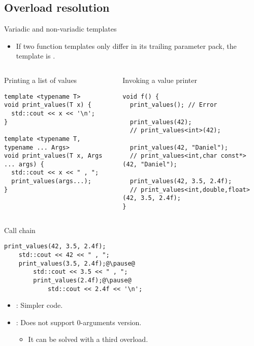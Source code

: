 \subsection{Overload resolution}

\begin{frame}[t,fragile]{Variadic and non-variadic templates}
  \begin{itemize}
    \item If two function templates only differ in its trailing
          parameter pack, the  template is .
  \end{itemize}

\begin{columns}[T]

\begin{block}{Printing a list of values}
\begin{lstlisting}
template <typename T>
void print_values(T x) {
  std::cout << x << '\n';
}

template <typename T, typename ... Args>
void print_values(T x, Args ... args) {
  std::cout << x << " , ";
  print_values(args...);
}
\end{lstlisting}
\end{block}

\begin{block}{Invoking a value printer}
\begin{lstlisting}
void f() {
  print_values(); // Error

  print_values(42);
  // print_values<int>(42);

  print_values(42, "Daniel");
  // print_values<int,char const*>(42, "Daniel");

  print_values(42, 3.5, 2.4f);
  // print_values<int,double,float>(42, 3.5, 2.4f);
}
\end{lstlisting}
\end{block}

\end{columns}
\end{frame}

\begin{frame}[t,fragile]{Call chain}
\begin{lstlisting}[escapechar=@]
print_values(42, 3.5, 2.4f);
    std::cout << 42 << " , ";
    print_values(3.5, 2.4f);@\pause@
        std::cout << 3.5 << " , ";
        print_values(2.4f);@\pause@
            std::cout << 2.4f << '\n';
\end{lstlisting}

\begin{itemize}
  \item {}: Simpler code.

  \item {}: Does not support 0-arguments version.
    \begin{itemize}
      \item It can be solved with a third overload.
    \end{itemize}
\end{itemize}
\end{frame}

